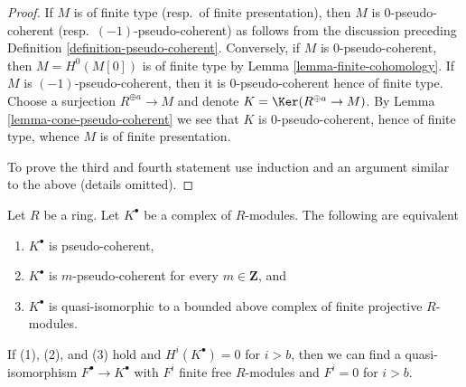 \begin{proof}
If $M$ is of finite type (resp.\ of finite presentation), then $M$
is $0$-pseudo-coherent (resp.\ $(-1)$-pseudo-coherent) as follows from the
discussion preceding
Definition \ref{definition-pseudo-coherent}.
Conversely, if $M$ is $0$-pseudo-coherent, then $M = H^0(M[0])$
is of finite type by
Lemma \ref{lemma-finite-cohomology}.
If $M$ is $(-1)$-pseudo-coherent, then it is $0$-pseudo-coherent hence
of finite type. Choose a surjection $R^{\oplus a} \to M$ and denote
$K = \Ker(R^{\oplus a} \to M)$. By
Lemma \ref{lemma-cone-pseudo-coherent}
we see that $K$ is $0$-pseudo-coherent, hence of finite type, whence
$M$ is of finite presentation.

\medskip\noindent
To prove the third and fourth statement use
induction and an argument similar to the above (details omitted).
\end{proof}

\begin{lemma}
\label{lemma-pseudo-coherent}
Let $R$ be a ring. Let $K^\bullet$ be a complex of $R$-modules.
The following are equivalent
\begin{enumerate}
\item $K^\bullet$ is pseudo-coherent,
\item $K^\bullet$ is $m$-pseudo-coherent for every $m \in \mathbf{Z}$, and
\item $K^\bullet$ is quasi-isomorphic to a bounded above complex of finite
projective $R$-modules.
\end{enumerate}
If (1), (2), and (3) hold and $H^i(K^\bullet) = 0$ for $i > b$, then
we can find a quasi-isomorphism $F^\bullet \to K^\bullet$ with
$F^i$ finite free $R$-modules and $F^i = 0$ for $i > b$.
\end{lemma}

